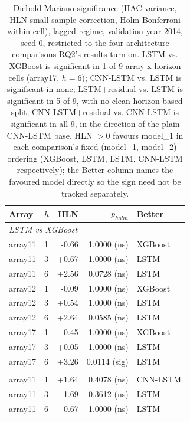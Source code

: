 \begin{table}[t]
  \centering
  \small
  \caption{Diebold-Mariano significance (HAC variance, HLN small-sample correction, Holm-Bonferroni within cell), lagged regime, validation year 2014, seed 0, restricted to the four architecture comparisons RQ2's results turn on. LSTM vs. XGBoost is significant in 1 of 9 array x horizon cells (array17, $h=6$); CNN-LSTM vs. LSTM is significant in none; LSTM+residual vs. LSTM is significant in 5 of 9, with no clean horizon-based split; CNN-LSTM+residual vs. CNN-LSTM is significant in all 9, in the direction of the plain CNN-LSTM base. HLN $>0$ favours model\_1 in each comparison's fixed (model\_1, model\_2) ordering (XGBoost, LSTM, LSTM, CNN-LSTM respectively); the Better column names the favoured model directly so the sign need not be tracked separately.}
  \label{tab:T6}
  \begin{tabular}{ll rrl}
    \toprule
    Array & $h$ & HLN & $p_{holm}$ & Better \\
    \midrule
    \multicolumn{5}{l}{\textit{LSTM vs XGBoost}} \\
    array11 & 1 & -0.66 & 1.0000 (ns) & XGBoost \\
    array11 & 3 & +0.67 & 1.0000 (ns) & LSTM \\
    array11 & 6 & +2.56 & 0.0728 (ns) & LSTM \\
    array12 & 1 & -0.09 & 1.0000 (ns) & XGBoost \\
    array12 & 3 & +0.54 & 1.0000 (ns) & LSTM \\
    array12 & 6 & +2.64 & 0.0585 (ns) & LSTM \\
    array17 & 1 & -0.45 & 1.0000 (ns) & XGBoost \\
    array17 & 3 & +0.05 & 1.0000 (ns) & LSTM \\
    array17 & 6 & +3.26 & 0.0114 (sig) & LSTM \\
    \addlinespace
    \multicolumn{5}{l}{\textit{CNN-LSTM vs LSTM}} \\
    array11 & 1 & +1.64 & 0.4078 (ns) & CNN-LSTM \\
    array11 & 3 & -1.69 & 0.3612 (ns) & LSTM \\
    array11 & 6 & -0.67 & 1.0000 (ns) & LSTM \\

\end{tabular}
\end{table}
